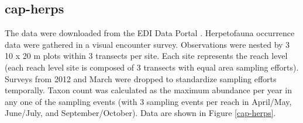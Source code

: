 \documentclass[11pt, oneside]{article}
\begin{document}
\subsection {cap-herps}
The data were downloaded from the EDI Data Portal \citep{cap-herps}.
Herpetofauna occurrence data were gathered in a visual encounter survey.
Observations were nested by 3 10 x 20 m plots within 3 transects per site. 
Each site represents the reach level (each reach level site is composed of 3 transects with equal area sampling efforts). 
Surveys from 2012 and March were dropped to standardize sampling efforts temporally. 
Taxon count was calculated as the maximum abundance per year in any one of the sampling events (with 3 sampling events per reach in April/May, June/July, and September/October). 
Data are shown in Figure \ref{cap-herps}.
\end{document}
